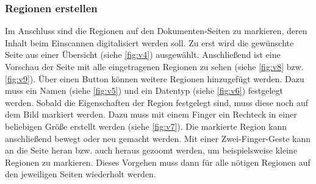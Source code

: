 \documentclass[notables, nomenclature, oneside, 150]{HSMW-Thesis}
\begin{document}
			\subsubsection*{Regionen erstellen}
				Im Anschluss sind die Regionen auf den Dokumenten-Seiten zu markieren, deren Inhalt beim Einscannen digitalisiert werden soll. Zu erst wird die gewünschte Seite aus einer Übersicht (siehe \ref{fig:v4}) ausgewählt. Anschließend ist eine Vorschau der Seite mit alle eingetragenen Regionen zu sehen (siehe \ref{fig:v8} bzw. \ref{fig:v9}). Über einen Button können weitere Regionen hinzugefügt werden. Dazu muss ein Namen (siehe \ref{fig:v5}) und ein Datentyp (siehe \ref{fig:v6}) festgelegt werden. Sobald die Eigenschaften der Region festgelegt sind, muss diese noch auf dem Bild markiert werden. Dazu muss mit einem Finger ein Rechteck in einer beliebigen Größe erstellt werden (siehe \ref{fig:v7}). Die markierte Region kann anschließend bewegt oder neu gemacht werden. Mit einer Zwei-Finger-Geste kann an die Seite heran bzw. auch heraus gezoomt werden, um beispielsweise kleine Regionen zu markieren. Dieses Vorgehen muss dann für alle nötigen Regionen auf den jeweiligen Seiten wiederholt werden. 
			
\end{document}
